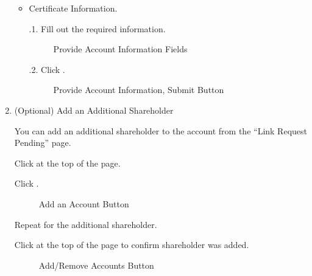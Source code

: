 \documentclass[letterpaper,10pt,english]{sphinxmanual}
\begin{document}
\begin{enumerate}
\begin{itemize}
\item {} 
\sphinxAtStartPar
Certificate Information.

.1.   Fill out the required information.

\begin{figure}[htbp]
\centering
\capstart

\noindent{}
\caption{Provide Account Information Fields}\label{\detokenize{index:id20}}\end{figure}

.2.   Click .

\begin{figure}[htbp]
\centering
\capstart

\noindent{}
\caption{Provide Account Information, Submit Button}\label{\detokenize{index:id22}}\end{figure}

\end{itemize}

\item {} 
\sphinxAtStartPar
(Optional) Add an Additional Shareholder

\sphinxAtStartPar
You can add an additional shareholder to the account from the “Link Request Pending” page.

 Click  at the top of the page.

 Click .

\begin{figure}[htbp]
\centering
\capstart

\noindent{}
\caption{Add an Account Button}\label{\detokenize{index:id26}}\end{figure}

 Repeat  for the additional shareholder.

 Click  at the top of the page to confirm shareholder was added.

\begin{figure}[htbp]
\centering
\capstart

\noindent{}
\caption{Add/Remove Accounts Button}\label{\detokenize{index:id28}}\end{figure}

\end{enumerate}



\renewcommand{\indexname}{Index}
\printindex
\end{document}
